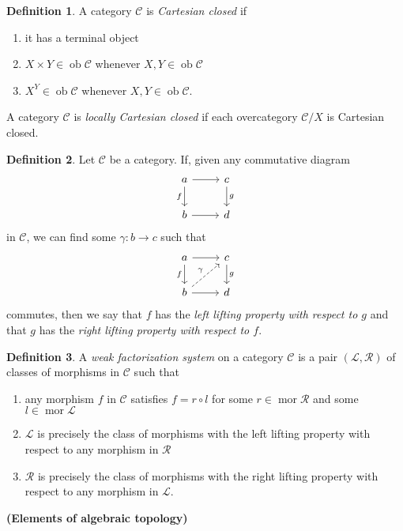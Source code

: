 \documentclass[10pt,letterpaper,cm]{nupset}
\theoremstyle{definition}
\newtheorem*{definition}{Definition}
\newcommand{\1}{\mathbf{1}}
\renewcommand{\c}{\mathscr{C}}
\newcommand{\0}{\vec 0}
\DeclareMathOperator{\ob}{ob}
\DeclareMathOperator{\mor}{mor}
\begin{document}
\begin{definition}
A category $\c$ is \textit{Cartesian closed} if
\begin{enumerate}
\item it has a terminal object
\item $X \times Y \in \ob{\c}$ whenever $X,Y\in \ob{\c}$
\item $X^Y \in \ob{\c}$ whenever $X,Y \in \ob{\c}$.
\end{enumerate}
A category $\c$ is \textit{locally Cartesian closed} if each overcategory $\c/X$ is Cartesian closed. 
\end{definition}

\begin{definition}
Let $\c$ be a category. If, given any commutative diagram
\[
\begin{tikzcd}
a \arrow[r] \arrow[d, "f"'] & c \arrow[d, "g"] \\
b \arrow[r] & d
\end{tikzcd}
\] in $\c$, we can find some $\gamma : b \to c$ such that
\[
\begin{tikzcd}
a \arrow[r] \arrow[d, "f"'] & c \arrow[d, "g"] \\
b \arrow[r] \arrow[ru, "\gamma", dashed] & d
\end{tikzcd}
\] commutes, then we say that $f$ has the \textit{left lifting property with respect to $g$} and that $g$ has the  \textit{right lifting property with respect to $f$}.
\end{definition}

\begin{definition}
A \textit{weak factorization system} on a category $\c$ is a pair $(\mathscr{L}, \mathscr{R})$ of classes of morphisms in $\c$ such that
\begin{enumerate}
\item any morphism $f$ in $\c$ satisfies $f = r \circ l$ for some $r\in \mor{\mathscr{R}}$ and some $l\in \mor{\mathscr{L}}$
\item $\mathscr{L}$ is precisely the class of morphisms with the left lifting property with respect to any morphism in $\mathscr{R}$
\item $\mathscr{R}$ is precisely the class of morphisms with the right  lifting property with respect to any morphism in $\mathscr{L}$.
\end{enumerate}
\end{definition}

\begin{center}
{\textbf{(Elements of algebraic topology)}} 
\end{center}
\end{document}
